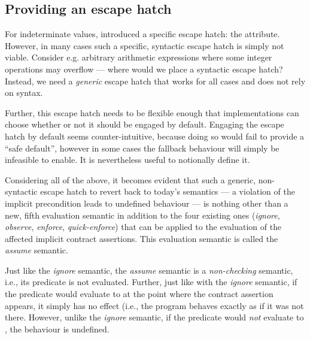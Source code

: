 \subsection{Providing an escape hatch}
\label{assume}

For indeterminate values, \cite{P2795R5} introduced a specific escape hatch: the \tcode{[[indeterminate]]} attribute. However, in many cases such a specific, syntactic escape hatch is simply not viable. Consider e.g. arbitrary arithmetic expressions where some integer operations may overflow --- where would we place a syntactic escape hatch? Instead, we need a \emph{generic} escape hatch that works for all cases and does not rely on syntax.

Further, this escape hatch needs to be flexible enough that implementations can choose whether or not it should be engaged by default. Engaging the escape hatch by default seems counter-intuitive, because doing so would fail to provide a ``safe default'', however in some cases the fallback behaviour will simply be infeasible to enable. It is nevertheless useful to notionally define it.

Considering all of the above, it becomes evident that such a generic, non-syntactic escape hatch to revert back to today's semantics --- a violation of the implicit precondition leads to undefined behaviour --- is nothing other than a new, fifth evaluation semantic in addition to the four existing ones (\emph{ignore}, \emph{observe}, \emph{enforce}, \emph{quick-enforce}) that can be applied to the evaluation of the affected implicit contract assertions. This evaluation semantic is called the \emph{assume} semantic.

Just like the \emph{ignore} semantic, the \emph{assume} semantic is a \emph{non-checking} semantic, i.e., its predicate is not evaluated. Further, just like with the \emph{ignore} semantic, if the predicate would  evaluate to  at the point where the contract assertion appears, it simply has no effect (i.e., the program behaves exactly as if it was not there. However, unlike the \emph{ignore} semantic, if the predicate would \emph{not} evaluate to , the behaviour is undefined.

